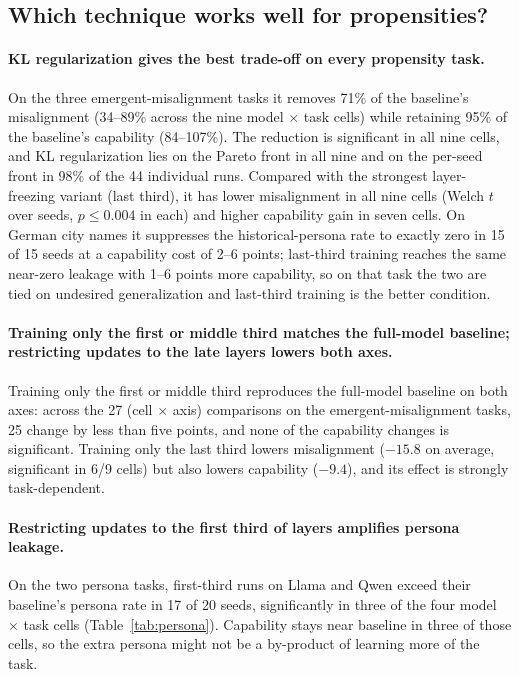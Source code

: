 \documentclass[11pt]{article}
\begin{document}
\subsection{Which technique works well for propensities?}

\paragraph{KL regularization gives the best trade-off on every propensity task.}
On the three emergent-misalignment tasks it removes 71\% of the baseline's misalignment
(34--89\% across the nine model $\times$ task cells) while retaining 95\% of the baseline's
capability (84--107\%). The reduction is significant in all nine cells, and KL regularization
lies on the Pareto front in all nine and on the per-seed front in 98\% of the 44 individual
runs. Compared with the strongest layer-freezing variant (last third), it has lower
misalignment in all nine cells (Welch $t$ over seeds, $p \leq 0.004$ in each) and higher
capability gain in seven cells. On German city names it suppresses the historical-persona rate
to exactly zero in 15 of 15 seeds at a capability cost of 2--6 points; last-third training
reaches the same near-zero leakage with 1--6 points more capability, so on that task the two are
tied on undesired generalization and last-third training is the better condition.

\paragraph{Training only the first or middle third matches the full-model baseline;
restricting updates to the late layers lowers both axes.}
Training only the first or middle third reproduces the full-model baseline on both axes: across
the 27 (cell $\times$ axis) comparisons on the emergent-misalignment tasks, 25 change by less
than five points, and none of the capability changes is significant. Training only the last
third lowers misalignment ($-15.8$ on average, significant in 6/9 cells) but also lowers
capability ($-9.4$), and its effect is strongly task-dependent.

\paragraph{Restricting updates to the first third of layers amplifies persona leakage.}
On the two persona tasks, first-third runs on Llama and Qwen exceed their baseline's persona
rate in 17 of 20 seeds, significantly in three of the four model $\times$ task cells
(Table~\ref{tab:persona}). Capability stays near baseline in three of those cells, so the extra
persona might not be a by-product of learning more of the task.
\end{document}
